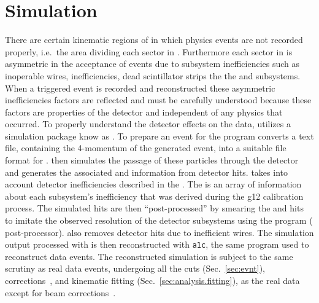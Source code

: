 \section{Simulation}\label{sec:analysis.simulation}
There are certain kinematic regions of  in which physics events are not recorded properly, i.e.~the area dividing each sector in . Furthermore each sector in  is asymmetric in the acceptance of events due to subsystem inefficiencies such as inoperable  wires,  inefficiencies, dead scintillator strips the the  and  subsystems. When a triggered event is recorded and reconstructed these asymmetric inefficiencies factors are reflected and must be carefully understood because these factors are properties of the  detector and independent of any physics that occurred. To properly understand the detector effects on the data,  utilizes a  simulation package know as . To prepare an event for  the program  converts a text file, containing the 4-momentum of the generated event, into a suitable file format for .  then simulates the passage of these particles through the  detector and generates the associated  and  information from detector hits.  takes into account detector inefficiencies described in the . The  is an array of information about each subsystem's inefficiency that was derived during the g12 calibration process. The  simulated hits are then ``post-processed'' by smearing the  and  hits to imitate the observed resolution of the detector subsystems using the program  ( post-processor).  also removes detector hits due to inefficient  wires. The simulation output processed with  is then reconstructed with \texttt{a1c}, the same program used to reconstruct data events. The reconstructed simulation is subject to the same scrutiny as real data events, undergoing all the cuts (Sec.~\ref{sec:evnt}), corrections~\cite{g12note}, and kinematic fitting (Sec.~\ref{sec:analysis.fitting}), as the real data except for beam corrections~\cite{g12note}.







